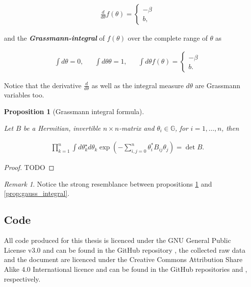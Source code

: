 \documentclass{article}
\theoremstyle{plain} %
\newtheorem{prop}[theorem]{Proposition}
\theoremstyle{convention} %
\theoremstyle{remark} %
\newtheorem*{remark}{Remark} %
\newcommand\listofproposals{\tcblistof[\subsection]{pp}{List of Proposals}}
\def\df#1{\textbf{\textit{#1}}}
\numberwithin{equation}{section}
\begin{document}
\begin{appendix}
\begin{align*}
  \frac{d}{d \theta} f(\theta) = \left\{
      \begin{array}{ll}
          -\beta \\
          b,
      \end{array}
  \right.
\end{align*}

and the \df{Grassmann-integral} of $f(\theta)$ over the complete range of $\theta$ as

\begin{align*}
  \int d \theta = 0, &&\int d \theta \theta = 1, &&\int d \theta f(\theta) = \left\{
      \begin{array}{ll}
          -\beta \\
          b.
      \end{array}
  \right.
\end{align*}

Notice that the derivative $\frac{d}{d \theta}$ as well as the integral measure $d \theta$ are Grassmann variables too.

\begin{prop}[Grassmann integral formula]

\label{prop:grassmann_integral}

Let $B$ be a Hermitian, invertible $n \times n$-matrix and $\theta_i \in \mathbb{G}$, for $i = 1, \dots, n$, then

\begin{align*}
  \prod_{k=1}^n \int d \theta_k^{\star} d \theta_k \exp( - \sum_{i,j=0}^n \theta_i^{*} B_{ij} \theta_j ) = \det B.
\end{align*}

\end{prop}

\begin{proof}

TODO

\end{proof}

\begin{remark}
  Notice the strong resemblance between propositions \ref{prop:grassmann_integral} and \ref{prop:gauss_integral}.
\end{remark}

\subsection{Code}
\label{sec:code}

All code produced for this thesis is licenced under the GNU General Public License v3.0 and can be found in the GitHub repository \cite{github_code}, the collected raw data and the document are licenced under the Creative Commons Attribution Share Alike 4.0 International licence and can be found in the GitHub repositories \cite{github_data} and \cite{github_doc}, respectively.

\listofproposals

\label{sec:proposals}

\end{appendix}

\printglossary[type=\acronymtype]

\printglossary
\end{document}
